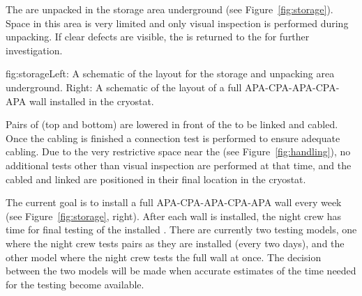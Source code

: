 The  are unpacked in the storage area underground (see Figure~\ref{fig:storage}). Space in this area is very limited and only visual inspection is performed during unpacking. If clear defects are visible, the  is returned to the  for further investigation.

\begin{dunefigure}{fig:storage}{Left: A schematic of the layout for the storage and unpacking area underground. Right: A schematic of the layout of a full APA-CPA-APA-CPA-APA wall installed in the cryostat.}
\setlength{\fboxsep}{0pt}
\setlength{\fboxrule}{0.5pt}
\end{dunefigure}

Pairs of  (top and bottom) are lowered in front of the  to be linked and cabled. Once the cabling is finished a connection test is performed to ensure adequate cabling. Due to the very restrictive space near the  (see Figure~\ref{fig:handling}), no additional tests other than visual inspection are performed at that time, and the cabled and linked  are positioned in their final location in the cryostat.


The current goal is to install a full APA-CPA-APA-CPA-APA wall every week (see Figure~\ref{fig:storage}, right). After each wall is installed, the night crew has time for final testing of the installed . There are currently two testing models, one where the night crew tests  pairs as they are installed (every two days), and the other model where the night crew tests the full wall at once. The decision between the two models will be made when accurate estimates of the time needed for the testing become available.

